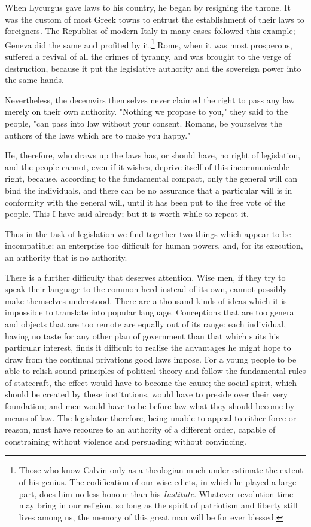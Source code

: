 \documentclass[12pt]{report}
\begin{document}
When Lycurgus gave laws to his country, he began by resigning the throne. It was the custom of most Greek towns to entrust the establishment of their laws to foreigners. The Republics of modern Italy in many cases followed this example; Geneva did the same and profited by it.\footnote{Those who know Calvin only as a theologian much under-estimate the extent of his genius. The codification of our wise edicts, in which he played a large part, does him no less honour than his \textit{Institute}. Whatever revolution time may bring in our religion, so long as the spirit of patriotism and liberty still lives among us, the memory of this great man will be for ever blessed.} Rome, when it was most prosperous, suffered a revival of all the crimes of tyranny, and was brought to the verge of destruction, because it put the legislative authority and the sovereign power into the same hands.

Nevertheless, the decemvirs themselves never claimed the right to pass any law merely on their own authority. "Nothing we propose to you," they said to the people, "can pass into law without your consent. Romans, be yourselves the authors of the laws which are to make you happy."

He, therefore, who draws up the laws has, or should have, no right of legislation, and the people cannot, even if it wishes, deprive itself of this incommunicable right, because, according to the fundamental compact, only the general will can bind the individuals, and there can be no assurance that a particular will is in conformity with the general will, until it has been put to the free vote of the people. This I have said already; but it is worth while to repeat it.

Thus in the task of legislation we find together two things which appear to be incompatible: an enterprise too difficult for human powers, and, for its execution, an authority that is no authority.

There is a further difficulty that deserves attention. Wise men, if they try to speak their language to the common herd instead of its own, cannot possibly make themselves understood. There are a thousand kinds of ideas which it is impossible to translate into popular language. Conceptions that are too general and objects that are too remote are equally out of its range: each individual, having no taste for any other plan of government than that which suits his particular interest, finds it difficult to realise the advantages he might hope to draw from the continual privations good laws impose. For a young people to be able to relish sound principles of political theory and follow the fundamental rules of statecraft, the effect would have to become the cause; the social spirit, which should be created by these institutions, would have to preside over their very foundation; and men would have to be before law what they should become by means of law. The legislator therefore, being unable to appeal to either force or reason, must have recourse to an authority of a different order, capable of constraining without violence and persuading without convincing.
\end{document}
